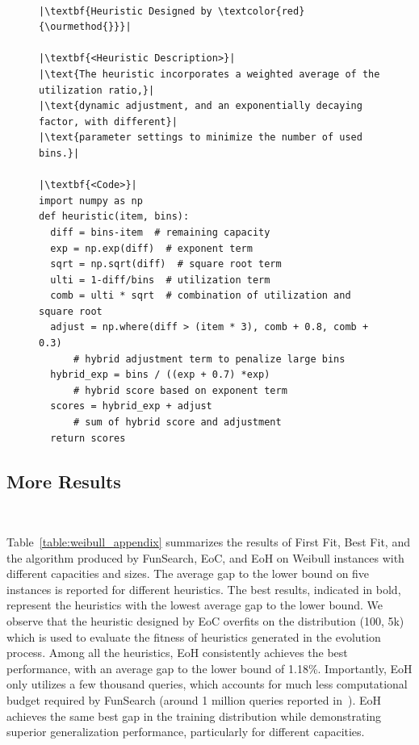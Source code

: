 \begin{figure}[htbp]
\begin{minipage}{0.99\linewidth}
\begin{lstlisting}

|\textbf{Heuristic Designed by \textcolor{red}{\ourmethod{}}}|

|\textbf{<Heuristic Description>}|
|\text{The heuristic incorporates a weighted average of the utilization ratio,}|
|\text{dynamic adjustment, and an exponentially decaying factor, with different}|
|\text{parameter settings to minimize the number of used bins.}|

|\textbf{<Code>}|
import numpy as np
def heuristic(item, bins):
  diff = bins-item  # remaining capacity
  exp = np.exp(diff)  # exponent term
  sqrt = np.sqrt(diff)  # square root term
  ulti = 1-diff/bins  # utilization term
  comb = ulti * sqrt  # combination of utilization and square root 
  adjust = np.where(diff > (item * 3), comb + 0.8, comb + 0.3)
      # hybrid adjustment term to penalize large bins 
  hybrid_exp = bins / ((exp + 0.7) *exp)
      # hybrid score based on exponent term
  scores = hybrid_exp + adjust
      # sum of hybrid score and adjustment
  return scores
\end{lstlisting}
\end{minipage}
\end{figure}

\subsection{More Results}~\label{more_results_bp}

Table~\ref{table:weibull_appendix} summarizes the results of First Fit, Best Fit, and the algorithm produced by FunSearch, EoC, and EoH on Weibull instances with different capacities and sizes. The average gap to the lower bound on five instances is reported for different heuristics. The best results, indicated in bold, represent the heuristics with the lowest average gap to the lower bound. We observe that the heuristic designed by EoC overfits on the distribution (100, 5k) which is used to evaluate the fitness of heuristics generated in the evolution process. Among all the heuristics, EoH consistently achieves the best performance, with an average gap to the lower bound of 1.18\%. Importantly, EoH only utilizes a few thousand queries, which accounts for much less computational budget required by FunSearch (around 1 million queries reported in~\citet{romera2024mathematical}). EoH achieves the same best gap in the training distribution while demonstrating superior generalization performance, particularly for different capacities. 

